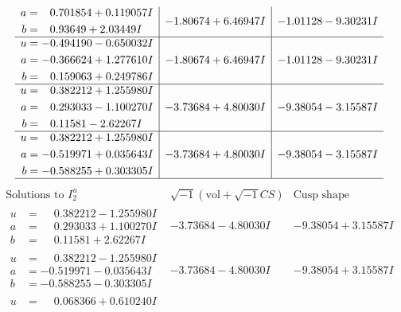 \documentclass[1p]{elsarticle_modified}
\theoremstyle{definition}
\newcommand{\I}{\sqrt{-1}}
\begin{document}
$$\begin{array}{c|c|c}
\begin{aligned}
a &= \phantom{-}0.701854 + 0.119057 I \\
b &= \phantom{-}0.93649 + 2.03449 I\end{aligned}
 & -1.80674 + 6.46947 I & -1.01128 - 9.30231 I \\ \hline\begin{aligned}
u &= -0.494190 - 0.650032 I \\
a &= -0.366624 + 1.277610 I \\
b &= \phantom{-}0.159063 + 0.249786 I\end{aligned}
 & -1.80674 + 6.46947 I & -1.01128 - 9.30231 I \\ \hline\begin{aligned}
u &= \phantom{-}0.382212 + 1.255980 I \\
a &= \phantom{-}0.293033 - 1.100270 I \\
b &= \phantom{-}0.11581 - 2.62267 I\end{aligned}
 & -3.73684 + 4.80030 I & -9.38054 - 3.15587 I \\ \hline\begin{aligned}
u &= \phantom{-}0.382212 + 1.255980 I \\
a &= -0.519971 + 0.035643 I \\
b &= -0.588255 + 0.303305 I\end{aligned}
 & -3.73684 + 4.80030 I & -9.38054 - 3.15587 I\\
 \hline 
 \end{array}$$\newpage$$\begin{array}{c|c|c}  
\text{Solutions to }I^u_{2}& \I (\text{vol} + \sqrt{-1}CS) & \text{Cusp shape}\\
 \hline 
\begin{aligned}
u &= \phantom{-}0.382212 - 1.255980 I \\
a &= \phantom{-}0.293033 + 1.100270 I \\
b &= \phantom{-}0.11581 + 2.62267 I\end{aligned}
 & -3.73684 - 4.80030 I & -9.38054 + 3.15587 I \\ \hline\begin{aligned}
u &= \phantom{-}0.382212 - 1.255980 I \\
a &= -0.519971 - 0.035643 I \\
b &= -0.588255 - 0.303305 I\end{aligned}
 & -3.73684 - 4.80030 I & -9.38054 + 3.15587 I \\ \hline\begin{aligned}
u &= \phantom{-}0.068366 + 0.610240 I \\

\end{aligned}
\end{array}$$
\end{document}
